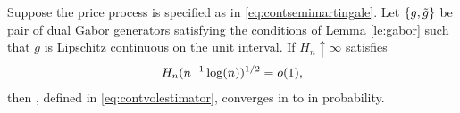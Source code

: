 \begin{prop}\label{pro:finite}
  Suppose the  price process is specified as in \eqref{eq:contsemimartingale}. Let $\{g, \tilde{g}\}$ be pair of dual Gabor generators satisfying the conditions of Lemma \ref{le:gabor} such that $g$ is Lipschitz continuous on the unit interval. 
If $H_n \uparrow \infty$ satisfies 
  \begin{align}
    H_n (n^{-1} \log(n))^{1/2} = o(1),\notag
    \label{}
  \end{align}
  then
  \svnx, defined in \eqref{eq:contvolestimator}, converges in \Ltwo to \sv in probability.
\end{prop}




\begin{comment}
\begin{remark}\mbox{}
  \begin{enumerate}
    \item The adaptive approach is not the only way to specify this estimator. We could have instead said something like the volatility paths are all Holder continuous with exponent at least $\alpha$ and are all contained in a Holder ball of at most $c$. This would give us a minimal rate. The holder ball is actually not too bad either. 
    \item The approach taken here is a little more theoretical and frankly does not add much more in terms approachability of friendliness. But it is the more mature approach. It lacks usefulness but it is precise.
    \item The difficulties here are of serveral order. 1. The thing to be estimated \sv is itself random. 2. the realisations of the thing to be estimated are paths not single numbers. 3. the paths of the thing to be estimated can vary very widely with regards smoothness. For example, the Brownian process can produce paths of anysmoothness imaginable; of course some of this paths have zero probability. The point is there is no single smoothness criterion that captures all the possibilities adequately. The best we can do is to restrict the type of processes to be considered by say something like only processes whose paths is Holder continuous with exponent at least $\alpha > 0$, but this will exclude the Brownian motion as a possible driver. In fact all non-deterministic semimartingales.
    \item the adaptive approach seems like the less of two evils.
    \item Under the assumption that \sv is compactly supported, could it be taken  for granted that the modulus of continuity is proportional to the step size? 
    \item Zigmonds theorem says $|\hat{f}(\rho)| \le (1/2)\omega(\pi/|\rho|)$. This works for $2\pi$ periodic functions defined on the entire real line. It possibly holds when the subset of the real line considered is compact.
  \end{enumerate}
\end{remark}
\end{comment}




